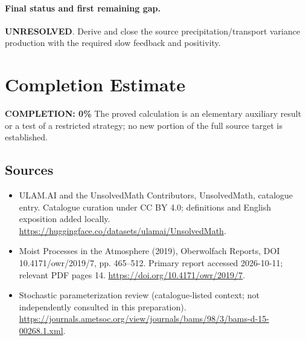 \documentclass[11pt]{article}
\begin{document}
\paragraph{Final status and first remaining gap.}
\textbf{UNRESOLVED}. Derive and close the source precipitation/transport variance production with the required slow feedback and positivity.

\section{Completion Estimate}
\noindent\textbf{COMPLETION: 0\%}
The proved calculation is an elementary auxiliary result or a test of a restricted strategy; no new portion of the full source target is established.

\subsection{Sources}
\begin{itemize}
\item[\hypertarget{source:statement:1}{S1}] ULAM.AI and the UnsolvedMath Contributors, UnsolvedMath, catalogue entry. Catalogue curation under CC BY 4.0; definitions and English exposition added locally.
\url{https://huggingface.co/datasets/ulamai/UnsolvedMath}.
\item[\hypertarget{source:statement:2}{S2}] Moist Processes in the Atmosphere (2019), Oberwolfach Reports, DOI 10.4171/owr/2019/7, pp. 465--512. Primary report accessed 2026-10-11; relevant PDF pages 14.
\url{https://doi.org/10.4171/owr/2019/7}.
\item[\hypertarget{source:statement:3}{S3}] Stochastic parameterization review (catalogue-listed context; not independently consulted in this preparation).
\url{https://journals.ametsoc.org/view/journals/bams/98/3/bams-d-15-00268.1.xml}.
\end{itemize}
\label{end:statement}
\end{document}
